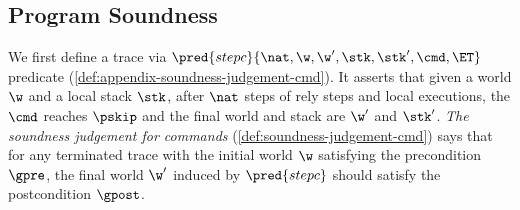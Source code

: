 \subsection{Program Soundness}

We first define a trace via \( \pred{stepc}{\nat, \w, \w', \stk, \stk', \cmd, \ET} \) predicate (\cref{def:appendix-soundness-judgement-cmd}).
It asserts that given a world \( \w \) and a local stack \( \stk \), after \( \nat \) steps of rely steps and local executions, the \( \cmd \) reaches \( \pskip \) and the final world and stack are \( \w'\) and \( \stk' \).
\emph{The soundness judgement for commands} (\cref{def:soundness-judgement-cmd}) says that
for any terminated trace with the initial world \( \w \) satisfying the precondition \( \gpre \), the final world \( \w' \) induced  by \( \pred{stepc} \) should satisfy the postcondition \( \gpost \).

